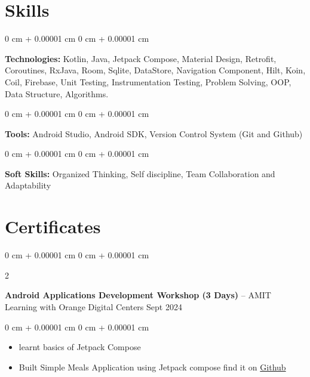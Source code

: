 \documentclass[10pt, letterpaper]{article}
\newenvironment{highlights}{
    \begin{itemize}[
        topsep=0.10 cm,
        parsep=0.10 cm,
        partopsep=0pt,
        itemsep=0pt,
        leftmargin=0 cm + 10pt
    ]
}{
    \end{itemize}
} %
\newenvironment{onecolentry}{
    \begin{adjustwidth}{
        0 cm + 0.00001 cm
    }{
        0 cm + 0.00001 cm
    }
}{
    \end{adjustwidth}
} %
\newenvironment{twocolentry}[2][]{
    \onecolentry
    \def\secondColumn{#2}
    \setcolumnwidth{\fill, 4.5 cm}
    \begin{paracol}{2}
}{
    \switchcolumn \raggedleft \secondColumn
    \end{paracol}
    \endonecolentry
} %
\begin{document}
    
    \section{Skills}



        
        \begin{onecolentry}
            \textbf{Technologies:} Kotlin, Java, Jetpack Compose, Material Design, Retrofit, Coroutines, RxJava, Room, Sqlite, DataStore, Navigation Component, Hilt, Koin, Coil, Firebase, Unit Testing, Instrumentation Testing, Problem Solving, OOP, Data Structure, Algorithms.
        \end{onecolentry}

        \vspace{0.2 cm}

        \begin{onecolentry}
            \textbf{Tools:} Android Studio, Android SDK, Version Control System (Git and Github)
        \end{onecolentry}

        \vspace{0.2 cm}

        \begin{onecolentry}
            \textbf{Soft Skills:} Organized Thinking, Self discipline, Team Collaboration and Adaptability
        \end{onecolentry}


    
    \section{Certificates}



        
        \begin{twocolentry}{
            Sept 2024
        }
            \textbf{Android Applications Development Workshop (3 Days)} -- AMIT Learning with Orange Digital Centers\end{twocolentry}

        \vspace{0.10 cm}
        \begin{onecolentry}
            \begin{highlights}
                \item learnt basics of Jetpack Compose
                \item Built Simple Meals Application using Jetpack compose find it on \href{https://github.com/Boodyahmedhamdy/ODCAmitMealsApp}{Github}
            \end{highlights}
        \end{onecolentry}
\end{document}
